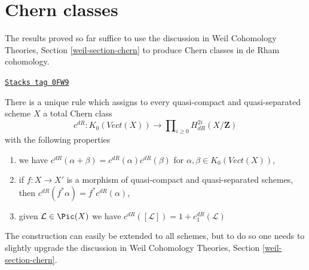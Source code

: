 \section{Chern classes}
\label{derham-section-chern-classes}
The results proved so far suffice to use the discussion in
Weil Cohomology Theories, Section \ref{weil-section-chern}
to produce Chern classes in de Rham cohomology.

\begin{lemma}
\label{derham-lemma-chern-classes}
\href{https://stacks.math.columbia.edu/tag/0FW9}{\texttt{Stacks tag 0FW9}}

There is a unique rule which assigns to every quasi-compact and
quasi-separated scheme $X$ a total Chern class
$$
c^{dR} :
K_0(\textit{Vect}(X))
\longrightarrow
\prod\nolimits_{i \geq 0} H^{2i}_{dR}(X/\mathbf{Z})
$$
with the following properties
\begin{enumerate}
\item we have $c^{dR}(\alpha + \beta) = c^{dR}(\alpha) c^{dR}(\beta)$
for $\alpha, \beta \in K_0(\textit{Vect}(X))$,
\item if $f : X \to X'$ is a morphism of quasi-compact and
quasi-separated schemes, then $c^{dR}(f^*\alpha) = f^*c^{dR}(\alpha)$,
\item given $\mathcal{L} \in \Pic(X)$ we have
$c^{dR}([\mathcal{L}]) = 1 + c_1^{dR}(\mathcal{L})$
\end{enumerate}
\end{lemma}

The construction can easily be extended to all schemes, but to do so one needs
to slightly upgrade the discussion in Weil Cohomology Theories,
Section \ref{weil-section-chern}.

